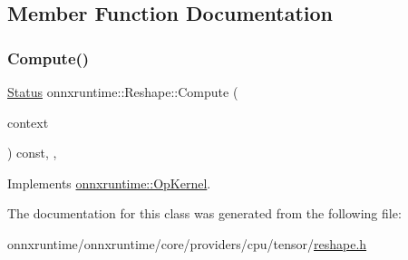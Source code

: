 \subsection{Member Function Documentation}
\mbox{\label{classonnxruntime_1_1Reshape_ace7322da25a10e2e9ae86d03d9870bb1}} 
\subsubsection{\texorpdfstring{Compute()}{Compute()}}
{\footnotesize\ttfamily \mbox{\hyperlink{classonnxruntime_1_1common_1_1Status}{Status}} onnxruntime\+::\+Reshape\+::\+Compute (\begin{DoxyParamCaption}\item[{\mbox{\hyperlink{classonnxruntime_1_1OpKernelContext}{Op\+Kernel\+Context}} $\ast$}]{context }\end{DoxyParamCaption}) const\hspace{0.3cm}{\ttfamily [inline]}, {\ttfamily [override]}, {\ttfamily [virtual]}}



Implements \mbox{\hyperlink{classonnxruntime_1_1OpKernel_a9eca8656a78b1b3ab9d3351a12798650}{onnxruntime\+::\+Op\+Kernel}}.



The documentation for this class was generated from the following file\+:\begin{DoxyCompactItemize}
\item 
onnxruntime/onnxruntime/core/providers/cpu/tensor/\mbox{\hyperlink{cpu_2tensor_2reshape_8h}{reshape.\+h}}\end{DoxyCompactItemize}
